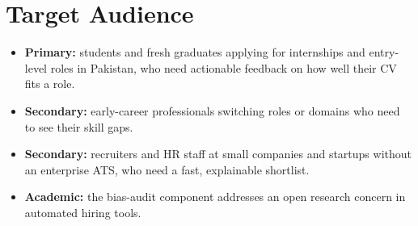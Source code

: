 \documentclass[11pt,a4paper]{article}
\begin{document}
\section{Target Audience}
\begin{itemize}
\item \textbf{Primary:} students and fresh graduates applying for internships and entry-level
roles in Pakistan, who need actionable feedback on how well their CV fits a role.
\item \textbf{Secondary:} early-career professionals switching roles or domains who need to see
their skill gaps.
\item \textbf{Secondary:} recruiters and HR staff at small companies and startups without an
enterprise ATS, who need a fast, explainable shortlist.
\item \textbf{Academic:} the bias-audit component addresses an open research concern in
automated hiring tools.
\end{itemize}

\end{document}
